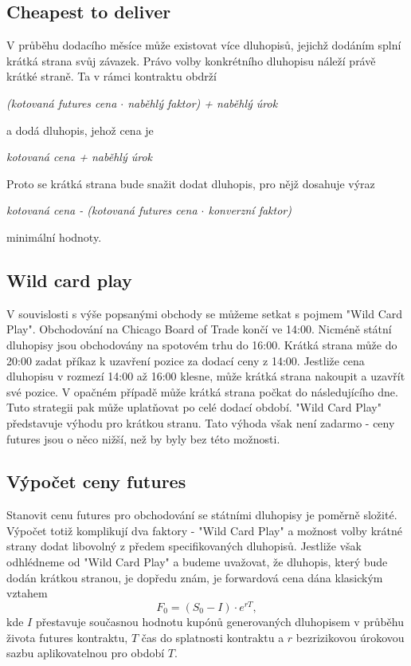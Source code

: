 \documentclass[a4paper]{book}
\begin{document}
\subsection{Cheapest to deliver}

V průběhu dodacího měsíce může existovat více dluhopisů, jejichž dodáním splní krátká strana svůj závazek. Právo volby konkrétního dluhopisu náleží právě krátké straně. Ta v rámci kontraktu obdrží
\begin{center}
\textit{(kotovaná futures cena $\cdot$ naběhlý faktor) + naběhlý úrok}
\end{center}
a dodá dluhopis, jehož cena je
\begin{center}
\textit{kotovaná cena + naběhlý úrok}
\end{center}
Proto se krátká strana bude snažit dodat dluhopis, pro nějž dosahuje výraz
\begin{center}
\textit{kotovaná cena - (kotovaná futures cena $\cdot$ konverzní faktor)}
\end{center}
minimální hodnoty.\\

\subsection{Wild card play}

V souvislosti s výše popsanými obchody se můžeme setkat s pojmem "Wild Card Play". Obchodování na Chicago Board of Trade končí ve 14:00. Nicméně státní dluhopisy jsou obchodovány na spotovém trhu do 16:00. Krátká strana může do 20:00 zadat příkaz k uzavření pozice za dodací ceny z 14:00. Jestliže cena dluhopisu v rozmezí 14:00 až 16:00 klesne, může krátká strana nakoupit a uzavřít své pozice. V opačném případě může krátká strana počkat do následujícího dne. Tuto strategii pak může uplatňovat po celé dodací období. "Wild Card Play" představuje výhodu pro krátkou stranu. Tato výhoda však není zadarmo - ceny futures jsou o něco nižší, než by byly bez této možnosti.

\subsection{Výpočet ceny futures}

Stanovit cenu futures pro obchodování se státními dluhopisy je poměrně složité. Výpočet totiž komplikují dva faktory - "Wild Card Play" a možnost volby krátné strany dodat libovolný z předem specifikovaných dluhopisů. Jestliže však odhlédneme od "Wild Card Play" a budeme uvažovat, že dluhopis, který bude dodán krátkou stranou, je dopředu znám, je forwardová cena dána klasickým vztahem
\begin{equation*}
 F_0 = (S_0 - I) \cdot e^{rT},
\end{equation*}
kde $I$ přestavuje současnou hodnotu kupónů generovaných dluhopisem v průběhu života futures kontraktu, $T$ čas do splatnosti kontraktu a $r$ bezrizikovou úrokovou sazbu aplikovatelnou pro období $T$.\\
\end{document}
